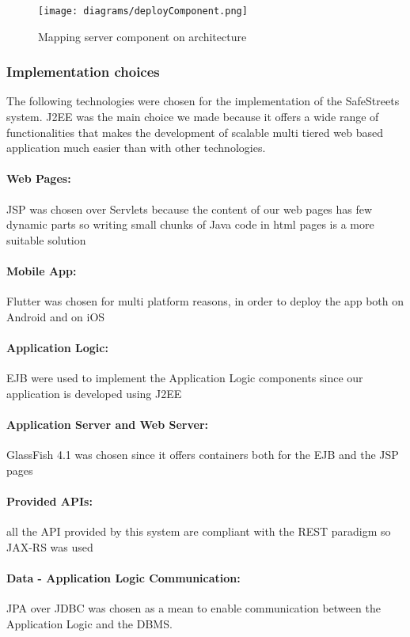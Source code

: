 \begin{figure}[h]
			\centering
			\texttt{[image: diagrams/deployComponent.png]}
			\caption{
				\label{fig:deployServerComponent} 
				Mapping server component on architecture
			}
		\end{figure}
\clearpage

\subsubsection{Implementation choices}
The following technologies were chosen for the implementation of the SafeStreets system. J2EE was the main choice we made because it offers a wide range of functionalities that makes the development of scalable multi tiered web based application much easier than with other technologies.

\paragraph{Web Pages:} JSP was chosen over Servlets because the content of our web pages has few dynamic parts so writing small chunks of Java code in html pages is a more suitable solution
\paragraph{Mobile App:} Flutter was chosen for multi platform reasons, in order to deploy the app both on Android and on iOS
\paragraph{Application Logic:} EJB were used to implement the Application Logic components since our application is developed using J2EE
\paragraph{Application Server and Web Server:} GlassFish 4.1 was chosen since it offers containers both for the EJB and the JSP pages 
\paragraph{Provided APIs:} all the API provided by this system are compliant with the REST paradigm so JAX-RS was used
\paragraph{Data - Application Logic Communication:} JPA over JDBC was chosen as a mean to enable communication between the Application Logic and the DBMS.

